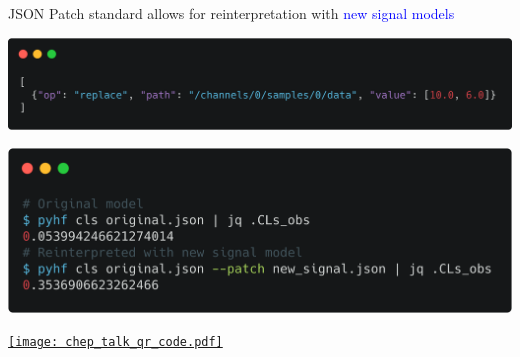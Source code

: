 \documentclass[a0,portrait]{a0poster}
\begin{document}
\begin{multicols}{2}
 \begin{center}
  JSON Patch standard allows for reinterpretation with \textcolor{blue}{new signal models}
 \end{center}
 \begin{center}
  \includegraphics[width=0.7\linewidth]{carbon_JSON_patch.png}
 \end{center}
 \begin{center}
  \includegraphics[width=0.7\linewidth]{carbon_reinterpretation.png}
 \end{center}

 \begin{minipage}{0.5\linewidth}
 \end{minipage}%
 \quad
 \begin{minipage}{0.5\linewidth}
  \begin{flushleft}
   \href{https://indico.cern.ch/event/773049/contributions/3476143/}{\texttt{[image: chep\_talk\_qr\_code.pdf]}}
  \end{flushleft}
 \end{minipage}%

\end{multicols}
\end{document}
